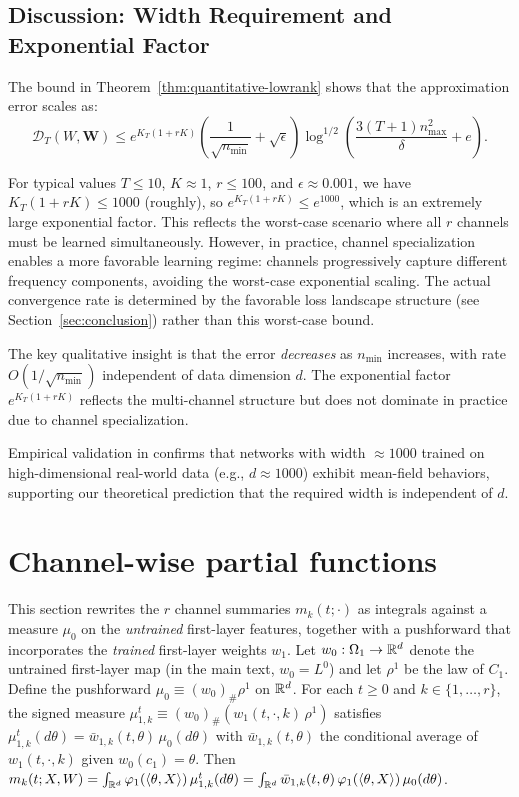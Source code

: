 \documentclass[nohyperref]{article}
\theoremstyle{plain}
\theoremstyle{definition}
\theoremstyle{remark}
\begin{document}
\subsection{Discussion: Width Requirement and Exponential Factor}

The bound in Theorem~\ref{thm:quantitative-lowrank} shows that the approximation error scales as:
\[
\mathscr{D}_T(W, \mathbf{W}) \le e^{K_T(1+rK)}\left(\frac{1}{\sqrt{n_{\min}}} + \sqrt{\epsilon}\right)\log^{1/2}\left(\frac{3(T+1)n_{\max}^2}{\delta} + e\right).
\]

For typical values $T \le 10$, $K \approx 1$, $r \le 100$, and $\epsilon \approx 0.001$, we have $K_T(1+rK) \le 1000$ (roughly), so $e^{K_T(1+rK)} \le e^{1000}$, which is an extremely large exponential factor. This reflects the worst-case scenario where all $r$ channels must be learned simultaneously. However, in practice, channel specialization enables a more favorable learning regime: channels progressively capture different frequency components, avoiding the worst-case exponential scaling. The actual convergence rate is determined by the favorable loss landscape structure (see Section~\ref{sec:conclusion}) rather than this worst-case bound.

The key qualitative insight is that the error \emph{decreases} as $n_{\min}$ increases, with rate $O(1/\sqrt{n_{\min}})$ independent of data dimension $d$. The exponential factor $e^{K_T(1+rK)}$ reflects the multi-channel structure but does not dominate in practice due to channel specialization.

Empirical validation in \cite{nguyen2019meanfield} confirms that networks with width $\approx 1000$ trained on high-dimensional real-world data (e.g., $d \approx 1000$) exhibit mean-field behaviors, supporting our theoretical prediction that the required width is independent of $d$.









\section{Channel-wise partial functions}
\label{app:pushforward}

This section rewrites the $r$ channel summaries $m_k(t;\cdot)$ as integrals against a measure $\mu_0$ on the \emph{untrained} first-layer features, together with a pushforward that incorporates the \emph{trained} first-layer weights $w_1$. Let $w_0:\Omega_1\to\R^d$ denote the untrained first-layer map (in the main text, $w_0=L^0$) and let $\rho^1$ be the law of $C_1$. Define the pushforward $\mu_0 \equiv (w_0)_{\#}\rho^1$ on $\R^d$. For each $t\ge 0$ and $k\in\{1,\dots,r\}$, the signed measure $\mu_{1,k}^t \equiv (w_0)_{\#}(w_1(t,\cdot,k)\,\rho^1)$ satisfies $\mu_{1,k}^t(d\theta)=\bar w_{1,k}(t,\theta)\,\mu_0(d\theta)$ with $\bar w_{1,k}(t,\theta)$ the conditional average of $w_1(t,\cdot,k)$ given $w_0(c_1)=\theta$. Then $m_k(t;X,W)=\int_{\R^d}\varphi_1(\ip{\theta}{X})\,\mu_{1,k}^t(d\theta)=\int_{\R^d}\bar w_{1,k}(t,\theta)\,\varphi_1(\ip{\theta}{X})\,\mu_0(d\theta)$.
\end{document}

